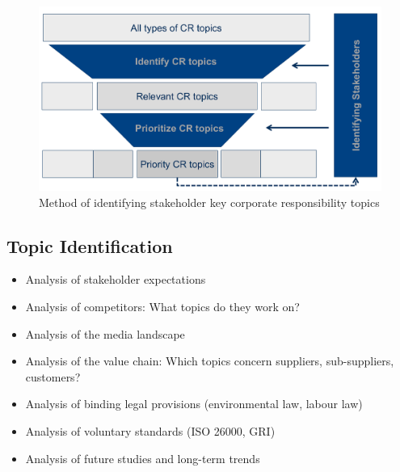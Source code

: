 \documentclass[11pt]{article}
\theoremstyle{definition}
\begin{document}
\begin{figure}[H]
	\centering
	\includegraphics[width=0.6\linewidth]{img/corporate_responsibility_topic_selection}
	\caption{Method of identifying stakeholder key corporate responsibility topics}
	\label{fig:corporateresponsibilitytopicselection}
\end{figure}

\subsection{Topic Identification}
\begin{itemize}
	\item Analysis of stakeholder expectations
	\item Analysis of competitors: What topics do they work on?
	\item Analysis of the media landscape
	\item Analysis of the value chain: Which topics concern suppliers, sub-suppliers, customers?
	\item Analysis of binding legal provisions (environmental law, labour law)
	\item Analysis of voluntary standards (ISO 26000, GRI)
	\item Analysis of future studies and long-term trends
\end{itemize}
\end{document}
